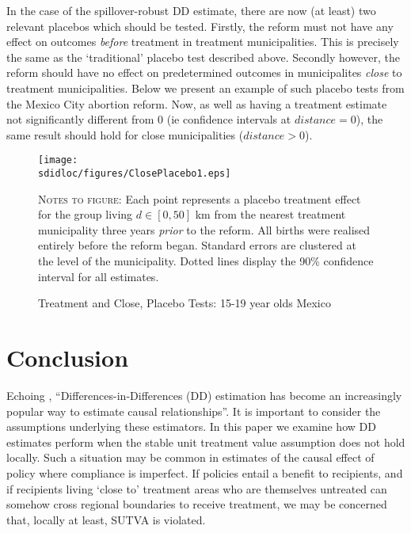 In the case of the spillover-robust DD estimate, there are now (at least) two
relevant placebos which should be tested.  Firstly, the reform must not have any
effect on outcomes \emph{before} treatment in treatment municipalities.  This is
precisely the same as the `traditional' placebo test described above.  Secondly
however, the reform should have no effect on predetermined outcomes in municipalites
\emph{close} to treatment municipalities.  Below we present an example of such 
placebo tests from the Mexico City abortion reform.  Now, as well as having a 
treatment estimate not significantly different from 0 (ie confidence intervals
at $distance=0$), the same result should hold for close municipalities ($distance>0$).
\begin{figure}[h!]
\texttt{[image: \\sdidloc/figures/ClosePlacebo1.eps]}
\caption{Treatment and Close, Placebo Tests: 15-19 year olds Mexico}
\label{SFig:MexClose}
\vspace{2mm}
\begin{footnotesize}
\textsc{Notes to figure}: Each point represents a placebo treatment effect for the 
group living $d\in [0,50]$ km from the nearest treatment municipality three years
\emph{prior} to the reform.  All births were realised entirely before the reform
began.  Standard errors are clustered at the level of the municipality.  Dotted 
lines display the 90\% confidence interval for all estimates.
\end{footnotesize}
\end{figure}




\section{Conclusion}
Echoing \citet{Bertrandetal2004}, ``Differences-in-Differences (DD) estimation 
has become an increasingly popular way to estimate causal relationships''.  
It is important to consider the assumptions underlying these estimators.  
In this paper we examine how DD estimates perform when the stable unit treatment 
value assumption does not hold locally.  Such a situation may be common in estimates 
of the causal effect of policy where compliance is imperfect.  If policies entail a 
benefit to recipients, and if recipients living `close to' treatment areas who are 
themselves untreated can somehow cross regional boundaries to receive treatment, we 
may be concerned that, locally at least, SUTVA is violated.

